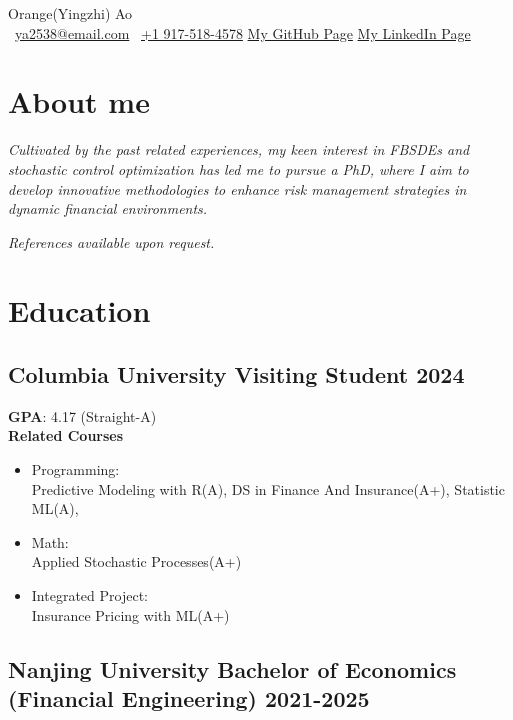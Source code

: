 \documentclass[a4paper]{article}
\newcommand{\org}{\color{org}}
\begin{document}
\begin{center}      
    {\fontsize{28}{28}\selectfont Orange(Yingzhi) Ao} \\ \vspace{5pt}
    {\org\faEnvelope[regular]}\ \href{mailto:ya2538@columbia.edu}{ya2538@email.com} \hfill
    {\org{}}\ \href{tel:+1 9175184578}{+1 917-518-4578} \hfill
    {\org\faGithub} \href{https://github.com/OrangeAoo}{My GitHub Page}  \hfill
    {\org\faLinkedin} \href{linkedin.com/in/orange-ao}{My LinkedIn Page}
\end{center}

\section{About me}  %

\textit{Cultivated by the past related experiences, my keen interest in FBSDEs and stochastic control optimization has led me to pursue a PhD, where I aim to develop innovative methodologies to enhance risk management strategies in dynamic financial environments.}

{\org \itshape References available upon request.}

\section{Education}  %

\subsection{Columbia University  \normalfont \hfill Visiting Student \hfill 2024}
\textbf{GPA}: 4.17 (Straight-A)\\
\textbf{Related Courses}
\begin{itemize}
    \item[\checkmark] Programming:\\
    \hypertarget{PM}{Predictive Modeling with R}(A), DS in Finance And Insurance(A+), Statistic ML(A), 
    \item[\checkmark] Math:\\
    Applied Stochastic Processes(A+)
    \item[\checkmark] Integrated Project:\\
    Insurance Pricing with ML(A+)
\end{itemize} 
\subsection{Nanjing University \normalfont \hfill Bachelor of Economics (Financial Engineering)  \hfill 2021-2025}
\end{document}
